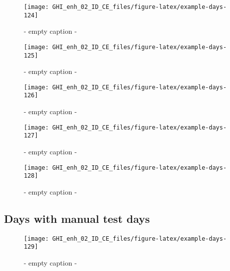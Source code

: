 \documentclass[
  10pt,
  a4paper,oneside]{article}
\begin{document}
\begin{figure}[H]

{\centering \texttt{[image: GHI\_enh\_02\_ID\_CE\_files/figure-latex/example-days-124]} 

}

\caption{ - empty caption - }\label{fig:example-days-124}
\end{figure}

\begin{figure}[H]

{\centering \texttt{[image: GHI\_enh\_02\_ID\_CE\_files/figure-latex/example-days-125]} 

}

\caption{ - empty caption - }\label{fig:example-days-125}
\end{figure}

\begin{figure}[H]

{\centering \texttt{[image: GHI\_enh\_02\_ID\_CE\_files/figure-latex/example-days-126]} 

}

\caption{ - empty caption - }\label{fig:example-days-126}
\end{figure}

\begin{figure}[H]

{\centering \texttt{[image: GHI\_enh\_02\_ID\_CE\_files/figure-latex/example-days-127]} 

}

\caption{ - empty caption - }\label{fig:example-days-127}
\end{figure}

\begin{figure}[H]

{\centering \texttt{[image: GHI\_enh\_02\_ID\_CE\_files/figure-latex/example-days-128]} 

}

\caption{ - empty caption - }\label{fig:example-days-128}
\end{figure}

\FloatBarrier

\hypertarget{days-with-manual-test-days}{%
\subsection{Days with manual test days}\label{days-with-manual-test-days}}

\begin{figure}[H]

{\centering \texttt{[image: GHI\_enh\_02\_ID\_CE\_files/figure-latex/example-days-129]} 

}

\caption{ - empty caption - }\label{fig:example-days-129}
\end{figure}
\end{document}
